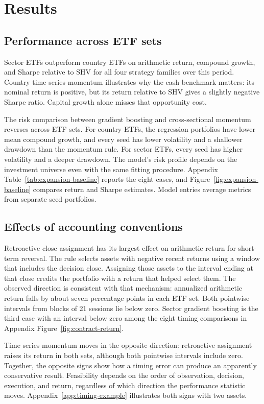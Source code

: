 \documentclass{article}
\begin{document}
\section{Results}

\subsection{Performance across ETF sets}

Sector ETFs outperform country ETFs on arithmetic return, compound growth, and Sharpe relative to SHV for all four strategy families over this period. Country time series momentum illustrates why the cash benchmark matters: its nominal return is positive, but its return relative to SHV gives a slightly negative Sharpe ratio. Capital growth alone misses that opportunity cost.

The risk comparison between gradient boosting and cross-sectional momentum reverses across ETF sets. For country ETFs, the regression portfolios have lower mean compound growth, and every seed has lower volatility and a shallower drawdown than the momentum rule. For sector ETFs, every seed has higher volatility and a deeper drawdown. The model's risk profile depends on the investment universe even with the same fitting procedure. Appendix Table~\ref{tab:expansion-baseline} reports the eight cases, and Figure~\ref{fig:expansion-baseline} compares return and Sharpe estimates. Model entries average metrics from separate seed portfolios.

\subsection{Effects of accounting conventions}

Retroactive close assignment has its largest effect on arithmetic return for short-term reversal. The rule selects assets with negative recent returns using a window that includes the decision close. Assigning those assets to the interval ending at that close credits the portfolio with a return that helped select them. The observed direction is consistent with that mechanism: annualized arithmetic return falls by about seven percentage points in each ETF set. Both pointwise intervals from blocks of 21 sessions lie below zero. Sector gradient boosting is the third case with an interval below zero among the eight timing comparisons in Appendix Figure~\ref{fig:contract-return}.

Time series momentum moves in the opposite direction: retroactive assignment raises its return in both sets, although both pointwise intervals include zero. Together, the opposite signs show how a timing error can produce an apparently conservative result. Feasibility depends on the order of observation, decision, execution, and return, regardless of which direction the performance statistic moves. Appendix~\ref{app:timing-example} illustrates both signs with two assets.
\end{document}
